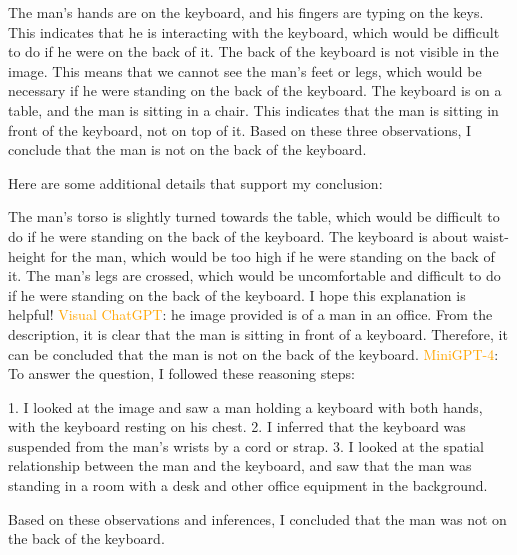 \begin{enumerate}
        The man's hands are on the keyboard, and his fingers are typing on the keys. This indicates that he is interacting with the keyboard, which would be difficult to do if he were on the back of it.
        The back of the keyboard is not visible in the image. This means that we cannot see the man's feet or legs, which would be necessary if he were standing on the back of the keyboard.
        The keyboard is on a table, and the man is sitting in a chair. This indicates that the man is sitting in front of the keyboard, not on top of it.
        Based on these three observations, I conclude that the man is not on the back of the keyboard.
        
        Here are some additional details that support my conclusion:
        
        The man's torso is slightly turned towards the table, which would be difficult to do if he were standing on the back of the keyboard.
        The keyboard is about waist-height for the man, which would be too high if he were standing on the back of it.
        The man's legs are crossed, which would be uncomfortable and difficult to do if he were standing on the back of the keyboard.
        I hope this explanation is helpful!
        \subitem \textcolor{orange}{Visual ChatGPT}: he image provided is of a man in an office. From the description, it is clear that the man is sitting in front of a keyboard. Therefore, it can be concluded that the man is not on the back of the keyboard.
        \subitem \textcolor{orange}{MiniGPT-4}: To answer the question, I followed these reasoning steps:

        1. I looked at the image and saw a man holding a keyboard with both hands, with the keyboard resting on his chest.
        2. I inferred that the keyboard was suspended from the man’s wrists by a cord or strap.
        3. I looked at the spatial relationship between the man and the keyboard, and saw that the man was standing in a room with a desk and other office equipment in the background.
        
        Based on these observations and inferences, I concluded that the man was not on the back of the keyboard.
    \end{enumerate}
